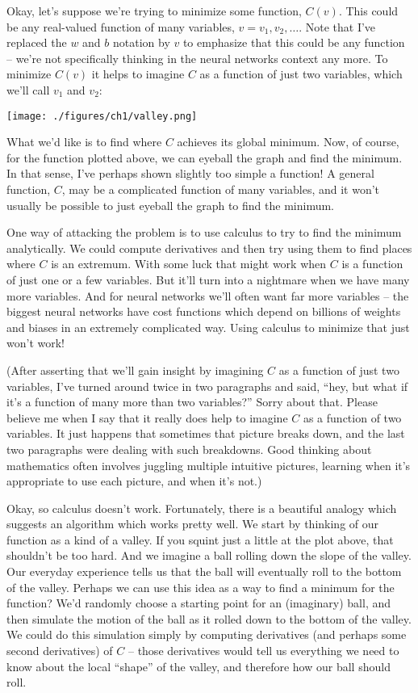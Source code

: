 \documentclass[a4paper,twoside,10pt]{book}
\begin{document}
Okay, let's suppose we're trying to minimize some function, $C(v)$. This could be any real-valued function of many variables, $v=v_1,v_2,\ldots$. Note that I've replaced the $w$ and $b$ notation by $v$ to emphasize that this could be any function -- we're not specifically thinking in the neural networks context any more. To minimize $C(v)$ it helps to imagine $C$ as a function of just two variables, which we'll call $v_1$ and $v_2$:
\begin{center}
	\texttt{[image: ./figures/ch1/valley.png]}
\end{center}
What we'd like is to find where $C$ achieves its global minimum. Now, of course, for the function plotted above, we can eyeball the graph and find the minimum. In that sense, I've perhaps shown slightly too simple a function! A general function, $C$, may be a complicated function of many variables, and it won't usually be possible to just eyeball the graph to find the minimum.

One way of attacking the problem is to use calculus to try to find the minimum analytically. We could compute derivatives and then try using them to find places where $C$ is an extremum. With some luck that might work when $C$ is a function of just one or a few variables. But it'll turn into a nightmare when we have many more variables. And for neural networks we'll often want far more variables -- the biggest neural networks have cost functions which depend on billions of weights and biases in an extremely complicated way. Using calculus to minimize that just won't work!

(After asserting that we'll gain insight by imagining $C$ as a function of just two variables, I've turned around twice in two paragraphs and said, ``hey, but what if it's a function of many more than two variables?'' Sorry about that. Please believe me when I say that it really does help to imagine $C$ as a function of two variables. It just happens that sometimes that picture breaks down, and the last two paragraphs were dealing with such breakdowns. Good thinking about mathematics often involves juggling multiple intuitive pictures, learning when it's appropriate to use each picture, and when it's not.)

\label{gradient_descent}
Okay, so calculus doesn't work. Fortunately, there is a beautiful analogy which suggests an algorithm which works pretty well. We start by thinking of our function as a kind of a valley. If you squint just a little at the plot above, that shouldn't be too hard. And we imagine a ball rolling down the slope of the valley. Our everyday experience tells us that the ball will eventually roll to the bottom of the valley. Perhaps we can use this idea as a way to find a minimum for the function? We'd randomly choose a starting point for an (imaginary) ball, and then simulate the motion of the ball as it rolled down to the bottom of the valley. We could do this simulation simply by computing derivatives (and perhaps some second derivatives) of $C$ -- those derivatives would tell us everything we need to know about the local ``shape'' of the valley, and therefore how our ball should roll.
\end{document}
